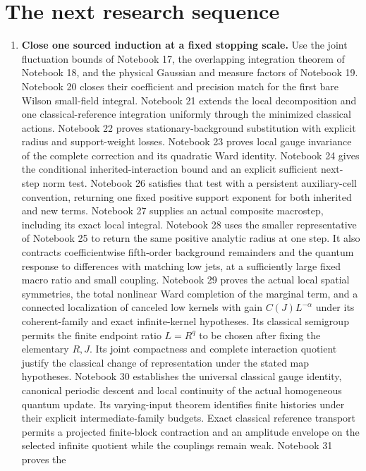 \documentclass[11pt]{article}
\theoremstyle{remark}
\begin{document}
\section{The next research sequence}

\begin{enumerate}
\item \textbf{Close one sourced induction at a fixed stopping scale.}
Use the joint fluctuation bounds of Notebook 17, the overlapping
integration theorem of Notebook 18, and the physical Gaussian and
measure factors of Notebook 19. Notebook 20 closes their coefficient
and precision match for the first bare Wilson small-field integral.
Notebook 21 extends the local decomposition and one classical-reference
integration uniformly through the minimized classical actions.
Notebook 22 proves stationary-background substitution with explicit
radius and support-weight losses. Notebook 23 proves local gauge
invariance of the complete correction and its quadratic Ward
identity. Notebook 24 gives the conditional inherited-interaction
bound and an explicit sufficient next-step norm test. Notebook 26
satisfies that test with a persistent auxiliary-cell convention,
returning one fixed positive support exponent for both inherited
and new terms. Notebook 27 supplies an actual composite macrostep,
including its exact local integral. Notebook 28 uses the smaller
representative of Notebook 25 to return the same positive analytic
radius at one step. It also contracts coefficientwise fifth-order
background remainders and the quantum response to differences
with matching low jets, at a sufficiently large fixed macro ratio
and small coupling. Notebook 29 proves the actual local spatial
symmetries, the total nonlinear Ward completion of the marginal
term, and a connected localization of canceled low kernels with
gain \(C(J)L^{-\alpha}\) under its coherent-family and exact
infinite-kernel hypotheses. Its classical semigroup permits
the finite endpoint ratio \(L=R^q\) to be chosen after fixing
the elementary \(R,J\). Its joint compactness and complete
interaction quotient justify the classical change of representation
under the stated map hypotheses. Notebook 30 establishes the
universal classical gauge identity, canonical periodic descent
and local continuity of the actual homogeneous quantum update.
Its varying-input theorem identifies finite histories under
their explicit intermediate-family budgets. Exact classical
reference transport permits a projected finite-block contraction
and an amplitude envelope on the selected infinite quotient
while the couplings remain weak. Notebook 31 proves the

\end{enumerate}
\end{document}
